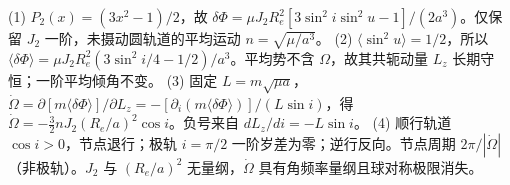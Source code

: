 (1) \(P_2(x)=(3x^2-1)/2\)，故 \(\delta\Phi=\mu J_2R_e^2[3\sin^2i\sin^2u-1]/(2a^3)\)。仅保留 \(J_2\) 一阶，未摄动圆轨道的平均运动 \(n=\sqrt{\mu/a^3}\)。
(2) \(\langle\sin^2u\rangle=1/2\)，所以 \(\langle\delta\Phi\rangle=\mu J_2R_e^2(3\sin^2i/4-1/2)/a^3\)。平均势不含 \(\Omega\)，故其共轭动量 \(L_z\) 长期守恒；一阶平均倾角不变。
(3) 固定 \(L=m\sqrt{\mu a}\)，\(\dot\Omega=\partial[m\langle\delta\Phi\rangle]/\partial L_z=-[\partial_i(m\langle\delta\Phi\rangle)]/(L\sin i)\)，得 \(\dot\Omega=-\frac32 nJ_2(R_e/a)^2\cos i\)。负号来自 \(dL_z/di=-L\sin i\)。
(4) 顺行轨道 \(\cos i>0\)，节点退行；极轨 \(i=\pi/2\) 一阶岁差为零；逆行反向。节点周期 \(2\pi/|\dot\Omega|\)（非极轨）。\(J_2\) 与 \((R_e/a)^2\) 无量纲，\(\dot\Omega\) 具有角频率量纲且球对称极限消失。
